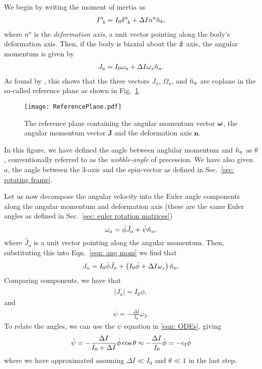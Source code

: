 \documentclass[../full_thesis/full_thesis.tex]{subfiles}
\begin{document}
We begin by writing the moment of inertia as
\begin{align}
I^{a}_{\;\;b} = I_{0} \delta^{a}_{\;\;b} + \Delta I n^a \hat{n}_b,
\end{align}
where $n^a$ is the \emph{deformation axis}, a unit vector pointing along the
body's deformation axis. Then, if the body is biaxial about the $\boldsymbol{\hat{z}}$ axis,
the angular momentum is given by
\begin{align}
J_{a} = I_0 \omega_a + \Delta I \omega_z \hat{n}_a.
\label{eqn: ang mom}
\end{align}
As found by \citet{Pines1972}, this shows that the three vectors $J_a$,
$\Omega_a$, and $\hat{n}_a$ are coplane in the so-called reference plane as shown in
Fig.~\ref{fig: reference plane}.
\begin{figure}[htb]
    \texttt{[image: ReferencePlane.pdf]}
    \caption{The reference plane containing the angular momentum vector $\boldsymbol{\omega}$,
    the angular momentum vector $\mathbf{J}$ and the deformation axis $\mathbf{n}$.}
    \label{fig: reference plane}
\end{figure}
In this figure, we have defined the angle between anglular momentum and $\hat{n}_a$ as
$\theta$, conventionally referred to as the \emph{wobble-angle} of
precession. We have also given $a$, the angle between the 3-axis and the
spin-vector as defined in Sec.~\ref{sec: rotating frame}.

Let us now decompose the angular velocity into the Euler angle components along
the angular momentum and deformation axis (these are the same Euler angles as defined in
Sec.~\ref{sec: euler rotation matrices})
\begin{equation}
  \omega_a = \dot{\phi}\hat{J}_a + \dot{\psi}\hat{n}_{a},
\label{eqn: decomp}
\end{equation}
where $\hat{J}_a$ is a unit vector pointing along the angular momentum. Then,
substituting this into Eqn.~\eqref{eqn: ang mom} we find that
\begin{align}
J_a = I_0 \dot{\phi} \hat{J}_a + \left(I_0 \dot{\phi} + \Delta I \omega_z\right)\hat{n}_a.
\end{align}
Comparing components, we have that
\begin{align}
|J_a| = I_0 \dot{\phi},
\end{align}
and
\begin{align}
\dot{\psi} = -\frac{\Delta I}{I_0} \omega_3.
\end{align}
To relate the angles, we can use the $\dot{\psi}$ equation in \eqref{eqn: ODEs},
giving
\begin{align}
\dot{\psi} = - \frac{\Delta I}{I_0 + \Delta I} \dot{\phi} \cos\theta
\approx -\frac{\Delta I}{I_0} \dot{\phi} = -\epsilon_{\mathrm{I}} \dot{\phi}
\label{eqn: psi phi}
\end{align}
where we have approximated assuming $\Delta I \ll I_0$ and $\theta \ll 1$ in
the last step.
\end{document}
